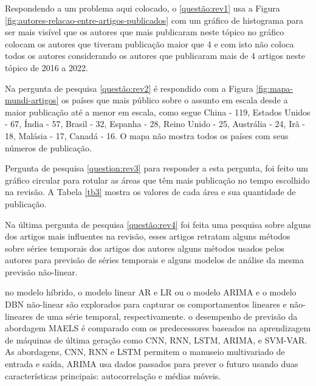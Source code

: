



 Respondendo a um problema aqui colocado, o \ref{questão:rev1} usa a Figura \ref{fig:autores-relacao-entre-artigos-publicados} com um gráfico de histograma para ser mais visível que os autores que mais publicaram neste tópico no gráfico colocam os autores que tiveram publicação maior que 4 e com isto não coloca todos os autores considerando os autores que publicaram mais de 4 artigos neste tópico de 2016 a 2022.




Na pergunta de pesquisa \ref{questão:rev2} é respondido com a Figura \ref{fig:mapa-mundi-artigos} os países que mais público sobre o assunto em escala desde a maior publicação até a menor em escala, como segue China - 119, Estados Unidos - 67, Índia - 57, Brasil - 32, Espanha - 28, Reino Unido - 25, Austrália - 24, Irã - 18, Malásia - 17, Canadá - 16. O mapa não mostra todos os países com seus números de publicação.




Pergunta de pesquisa \ref{question:rev3} para responder a esta pergunta, foi feito um gráfico circular para rotular as áreas que têm mais publicação no tempo escolhido na revisão. A Tabela \ref{tb3} mostra os valores de cada área e sua quantidade de publicação. 


	

Na última pergunta de pesquisa \ref{questão:rev4} foi feita uma pesquisa sobre alguns dos artigos mais influentes na revisão, esses artigos retratam alguns métodos sobre séries temporais dos artigos dos autores 
 alguns métodos usados pelos autores para previsão de séries temporais e alguns modelos de análise da mesma previsão não-linear. 

 
 no modelo híbrido, o modelo linear AR e LR ou o modelo ARIMA e o modelo DBN não-linear são explorados para capturar os comportamentos lineares e não-lineares de uma série temporal, respectivamente.  o desempenho de previsão da abordagem MAELS é comparado com os predecessores baseados na aprendizagem de máquinas de última geração como CNN, RNN, LSTM, ARIMA, e SVM-VAR. As abordagens, CNN, RNN e LSTM permitem o manuseio multivariado de entrada e saída, ARIMA usa dados passados para prever o futuro usando duas características principais: autocorrelação e médias móveis.


